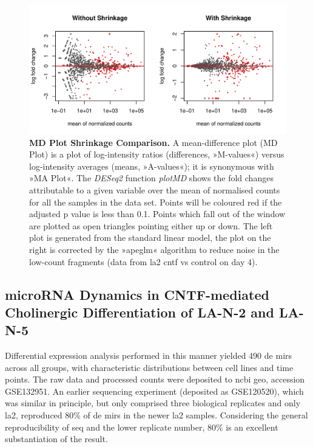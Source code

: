 \begin{figure}
\centering
\includegraphics[width=\textwidth]{figures/apeglm-comp-la2d4}
\caption[MD Plot Shrinkage Comparison.]{\textbf{MD Plot Shrinkage Comparison.} A mean-difference plot (MD Plot) is a plot of log-intensity ratios (differences, »M-values«) versus log-intensity averages (means, »A-values«); it is synonymous with »MA Plot«. The \textit{DESeq2} function \textit{plotMD} shows the fold changes attributable to a given variable over the mean of normalised counts for all the samples in the data set. Points will be coloured red if the adjusted p value is less than 0.1. Points which fall out of the window are plotted as open triangles pointing either up or down. The left plot is generated from the standard linear model, the plot on the right is corrected by the »apeglm« algorithm\cite{Zhu2019} to reduce noise in the low-count fragments (data from \ac{la2} \ac{cntf} vs control on day 4).
\label{fig:apeglm-comp-la2d4}}
\end{figure}

\subsection{microRNA Dynamics in CNTF-mediated Cholinergic Differentiation of LA-N-2 and LA-N-5}
Differential expression analysis performed in this manner yielded 490 \ac{de} \acp{mir} across all groups, with characteristic distributions between cell lines and time points. The raw data and processed counts were deposited to \ac{ncbi} \ac{geo}, accession GSE132951. An earlier sequencing experiment (deposited as GSE120520), which was similar in principle, but only comprised three biological replicates and only \ac{la2}, reproduced 80\% of \ac{de} \acp{mir} in the newer \ac{la2} samples. Considering the general reproducibility of \ac{seq} and the lower replicate number, 80\% is an excellent substantiation of the result.

